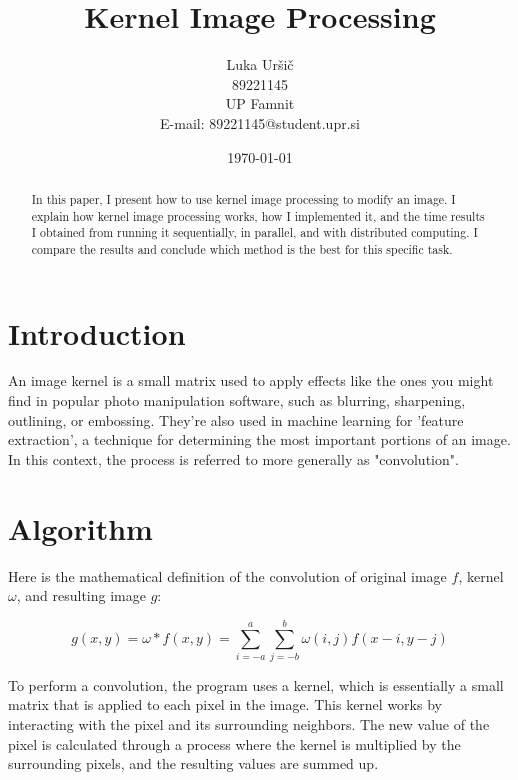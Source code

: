\documentclass{article}
\title{Kernel Image Processing}
\author{Luka Uršič \\ 89221145 \\ UP Famnit \\ E-mail: 89221145@student.upr.si}
\date{\today}
\begin{document}
\maketitle
\thispagestyle{empty}

\begin{abstract}
    In this paper, I present how to use kernel image processing to modify an image. I explain how kernel image processing works, how I implemented it, and the time results I obtained from running it sequentially, in parallel, and with distributed computing. I compare the results and conclude which method is the best for this specific task.
\end{abstract}

\begin{multicols}{2}

    \section{Introduction}
    An image kernel is a small matrix used to apply effects like the ones you might find in popular photo manipulation software, such as blurring, sharpening, outlining, or embossing. They're also used in machine learning for 'feature extraction', a technique for determining the most important portions of an image. In this context, the process is referred to more generally as "convolution".

    \cite{setosa}

    \section{Algorithm}

    Here is the mathematical definition of the convolution of original image $f$, kernel $\omega$, and resulting image $g$:

    \begin{equation}
        g(x, y) = \omega * f(x, y) = \sum_{i=-a}^{a} \sum_{j=-b}^{b} \omega(i, j) f(x-i, y-j)
    \end{equation}

    \cite{wikipedia}

    \vfill

    To perform a convolution, the program uses a kernel, which is essentially a small matrix that is applied to each pixel in the image. This kernel works by interacting with the pixel and its surrounding neighbors. The new value of the pixel is calculated through a process where the kernel is multiplied by the surrounding pixels, and the resulting values are summed up.


\end{multicols}
\end{document}

